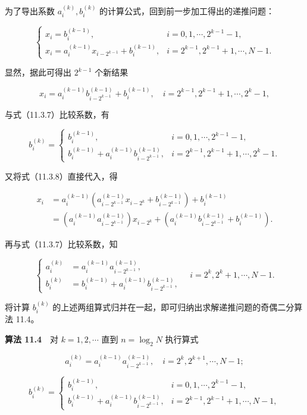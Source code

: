 \documentclass[
  10pt,
  fontset=fandol]{ctexart}
\begin{document}
为了导出系数 \(a_i^{(k)},b_i^{(k)}\) 的计算公式，回到前一步加工得出的递推问题：

\[
\begin{cases}
x_i=b_i^{(k-1)},& i=0,1,\cdots,2^{k-1}-1,\\
x_i=a_i^{(k-1)}x_{i-2^{k-1}}+b_i^{(k-1)},& i=2^{k-1},2^{k-1}+1,\cdots,N-1.
\end{cases}
\tag{11.3.8}
\]

显然，据此可得出 \(2^{k-1}\) 个新结果

\[
x_i=a_i^{(k-1)}b_{i-2^{k-1}}^{(k-1)}+b_i^{(k-1)},\quad i=2^{k-1},2^{k-1}+1,\cdots,2^k-1,
\]

与式（11.3.7）比较系数，有

\[
b_i^{(k)}=
\begin{cases}
b_i^{(k-1)},& i=0,1,\cdots,2^{k-1}-1,\\
b_i^{(k-1)}+a_i^{(k-1)}b_{i-2^{k-1}}^{(k-1)},& i=2^{k-1},2^{k-1}+1,\cdots,2^k-1.
\end{cases}
\tag{11.3.9}
\]

又将式（11.3.8）直接代入，得

\[
\begin{aligned}
x_i
&=a_i^{(k-1)}\left(a_{i-2^{k-1}}^{(k-1)}x_{i-2^k}+b_{i-2^{k-1}}^{(k-1)}\right)+b_i^{(k-1)}\\
&=\left(a_i^{(k-1)}a_{i-2^{k-1}}^{(k-1)}\right)x_{i-2^k}+\left(a_i^{(k-1)}b_{i-2^{k-1}}^{(k-1)}+b_i^{(k-1)}\right).
\end{aligned}
\]

再与式（11.3.7）比较系数，知

\[
\left\{
\begin{aligned}
a_i^{(k)}&=a_i^{(k-1)}a_{i-2^{k-1}}^{(k-1)},\\
b_i^{(k)}&=b_i^{(k-1)}+a_i^{(k-1)}b_{i-2^{k-1}}^{(k-1)},
\end{aligned}
\right.
\quad i=2^k,2^k+1,\cdots,N-1.
\]

将计算 \(b_i^{(k)}\) 的上述两组算式归并在一起，即可归纳出求解递推问题的奇偶二分算法 11.4。

\textbf{算法 11.4}　对 \(k=1,2,\cdots\) 直到 \(n=\log_2 N\) 执行算式

\[
a_i^{(k)}=a_i^{(k-1)}a_{i-2^{k-1}}^{(k-1)},\quad i=2^k,2^{k+1},\cdots,N-1;
\tag{11.3.10}
\]

\[
b_i^{(k)}=
\begin{cases}
b_i^{(k-1)},& i=0,1,\cdots,2^{k-1}-1,\\
b_i^{(k-1)}+a_i^{(k-1)}b_{i-2^{k-1}}^{(k-1)},& i=2^{k-1},2^{k-1}+1,\cdots,N-1,
\end{cases}
\tag{11.3.11}
\]
\end{document}
